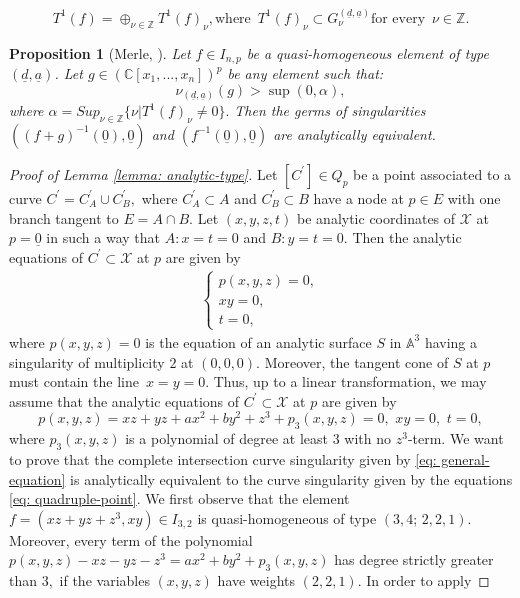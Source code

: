 \documentclass[plain]{amsart}
\newtheorem{proposition}[theorem]{\textbf{Proposition}}
\begin{document}
$$
T^1(f)=\oplus_{\nu\in\mathbb Z}T^1(f)_\nu, \textrm{where}\,\,\,T^1(f)_\nu\subset G^{(\underline d,\underline a)}_\nu
\textrm{for every}\,\,\,\nu\in\mathbb Z.
$$
\begin{proposition}[Merle, {\cite[Proposition 1]{giusti}}]\label{merle}
Let $f\in I_{n,p}$ be a quasi-homogeneous element of type $(\underline d,\underline a)$.
Let $g\in (\mathbb C[x_1,...,x_n])^p$ be any element such that:
$$
\nu_{(\underline d,\underline a)}(g)>\sup(0,\alpha),
$$
where $\alpha=Sup_{\nu\in\mathbb Z}\{\nu | T^1(f)_\nu\neq 0\}.$ Then the germs of singularities
$((f+g)^{-1}(\underline 0),\underline 0)$ and $(f^{-1}(\underline 0),\underline 0)$ are analytically equivalent. 
\end{proposition}

\begin{proof}[Proof of Lemma \ref{lemma: analytic-type}]
Let $[C^\prime]\in Q_p$ be a point associated to a curve $C^\prime=C_A^\prime\cup C_B^\prime,$  where
 $C_A^\prime\subset A$ 
and $C_B^\prime\subset B$ have a node at $p\in E$ with one branch tangent to $E=A\cap B.$ Let
$(x,y,z,t)$ be analytic coordinates of $\mathcal X$ at $p=\underline 0$ in such a way that $A:x=t=0$ and $B:y=t=0.$ 
Then the analytic equations of $C^\prime\subset\mathcal X$ at $p$ are given by 
\begin{eqnarray}\label{eq: general-equation}
\left\{\begin{array}{l}
p(x,y,z)=0,\\
xy=0, \\
t=0,
\end{array}\right.
\end{eqnarray}
where $p(x,y,z)=0$ is the equation of an analytic surface $S$ in $\mathbb A^3$ having 
a singularity of multiplicity $2$ at $(0,0,0).$ Moreover, the tangent cone of $S$ at $p$ must contain the
line $\,x=y=0.$ Thus, up to a linear transformation, we may assume that the 
analytic equations of $C^\prime\subset\mathcal X$ at $p$ are given by
$$
p(x,y,z)=xz+yz+ax^2+by^2+z^3+p_3(x,y,z)=0,\,\,xy=0,\,\,t=0,
$$
where $p_3(x,y,z)$ is a polynomial of degree at least $3$ with no $z^3$-term. 
We want to prove that the complete intersection curve singularity given by \eqref{eq: general-equation}
is analytically equivalent to the curve singularity given by the equations \eqref{eq: quadruple-point}.
We first observe
that the element $f=(xz+yz+z^3,xy)\in I_{3,2}$ is quasi-homogeneous of type
$(3,4;\,2,2,1).$ Moreover, every term of the polynomial $p(x,y,z)-xz-yz-z^3=ax^2+by^2+p_3(x,y,z)$ 
has degree strictly greater than $3,$ if the variables $(x,y,z)$ have weights $(2,2,1).$ In order to apply

\end{proof}
\end{document}
